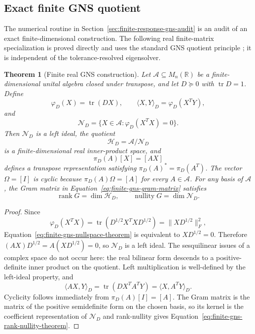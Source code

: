 \documentclass[11pt]{article}
\newtheorem{theorem}[definition]{Theorem}
\theoremstyle{remark}
\numberwithin{equation}{section}
\begin{document}
\subsection{Exact finite GNS quotient}
The numerical routine in Section~\ref{sec:finite-response-gns-audit} is an audit of an exact finite-dimensional construction. The following real finite-matrix specialization is proved directly and uses the standard GNS quotient principle \cite{GelfandNaimark1943,Segal1947}; it is independent of the tolerance-resolved eigensolver.

\begin{theorem}[Finite real GNS construction]\label{thm:finite-real-gns}
Let \(\mathcal A\subseteq M_n(\mathbb R)\) be a finite-dimensional unital algebra closed under transpose, and let \(D\succeq0\) with \(\operatorname{tr}D=1\). Define
\[
 \varphi_D(X)=\operatorname{tr}(DX),\qquad
 \langle X,Y\rangle_D=\varphi_D(X^TY),
\]
and
\begin{equation}
 \mathcal N_D=\{X\in\mathcal A:\varphi_D(X^TX)=0\}.
 \label{eq:finite-gns-nullspace-theorem}
\end{equation}
Then \(\mathcal N_D\) is a left ideal, the quotient
\[
 \mathcal H_D=\mathcal A/\mathcal N_D
\]
is a finite-dimensional real inner-product space, and
\[
 \pi_D(A)[X]=[AX]
\]
defines a transpose representation satisfying \(\pi_D(A)^*=\pi_D(A^T)\). The vector \(\Omega=[I]\) is cyclic because \(\pi_D(A)\Omega=[A]\) for every \(A\in\mathcal A\). For any basis of \(\mathcal A\), the Gram matrix in Equation~\eqref{eq:finite-gns-gram-matrix} satisfies
\begin{equation}
  \operatorname{rank}G=\dim\mathcal H_D,
  \qquad
  \operatorname{nullity}G=\dim\mathcal N_D.
  \label{eq:finite-gns-rank-nullity-theorem}
\end{equation}
\end{theorem}

\begin{proof}
Since
\[
 \varphi_D(X^TX)
 =\operatorname{tr}(D^{1/2}X^TXD^{1/2})
 =\|XD^{1/2}\|_F^2,
\]
Equation~\eqref{eq:finite-gns-nullspace-theorem} is equivalent to \(XD^{1/2}=0\). Therefore \((AX)D^{1/2}=A(XD^{1/2})=0\), so \(\mathcal N_D\) is a left ideal. The sesquilinear issues of a complex space do not occur here: the real bilinear form descends to a positive-definite inner product on the quotient. Left multiplication is well-defined by the left-ideal property, and
\[
 \langle AX,Y\rangle_D
 =\operatorname{tr}(DX^TA^TY)
 =\langle X,A^TY\rangle_D.
\]
Cyclicity follows immediately from \(\pi_D(A)[I]=[A]\). The Gram matrix is the matrix of the positive semidefinite form on the chosen basis, so its kernel is the coefficient representation of \(\mathcal N_D\) and rank-nullity gives Equation~\eqref{eq:finite-gns-rank-nullity-theorem}.
\end{proof}
\end{document}
